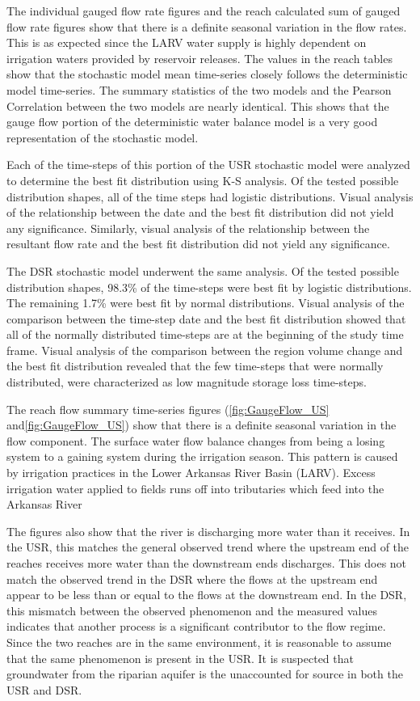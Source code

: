 The individual gauged flow rate figures and the reach calculated sum of gauged flow rate figures show that there is a definite seasonal variation in the flow rates.  This is as expected since the LARV water supply is highly dependent on irrigation waters provided by reservoir releases.  The values in the reach tables show that the stochastic model mean time-series closely follows the deterministic model time-series.  The summary statistics of the two models and the Pearson Correlation between the two models are nearly identical.  This shows that the gauge flow portion of the deterministic water balance model is a very good representation of the stochastic model.  

Each of the time-steps of this portion of the USR stochastic model were analyzed to determine the best fit distribution using K-S analysis.  Of the tested possible distribution shapes, all of the time steps had logistic distributions.  Visual analysis of the relationship between the date and the best fit distribution did not yield any significance.  Similarly, visual analysis of the relationship between the resultant flow rate and the best fit distribution did not yield any significance. 

The DSR stochastic model underwent the same analysis.  Of the tested possible distribution shapes, 98.3\% of the time-steps were best fit by logistic distributions.  The remaining 1.7\% were best fit by normal distributions.  Visual analysis of the comparison between the time-step date and the best fit distribution showed that all of the normally distributed time-steps are at the beginning of the study time frame.   Visual analysis of the comparison between the region volume change and the best fit distribution revealed that the few time-steps that were normally distributed, were characterized as low magnitude storage loss time-steps.

The reach flow summary time-series figures (\ref{fig:GaugeFlow_US} and\ref{fig:GaugeFlow_US}) show that there is a definite seasonal variation in the flow component.  The surface water flow balance changes from being a losing system to a gaining system during the irrigation season.  This pattern is caused by irrigation practices in the Lower Arkansas River Basin (LARV).  Excess irrigation water applied to fields runs off into tributaries which feed into the Arkansas River

The figures also show that the river is discharging more water than it receives.  In the USR, this matches the general observed trend where the upstream end of the reaches receives more water than the downstream ends discharges.  This does not match the observed trend in the DSR where the flows at the upstream end appear to be less than or equal to the flows at the downstream end.  In the DSR, this mismatch between the observed phenomenon and the measured values indicates that another process is a significant contributor to the flow regime.  Since the two reaches are in the same environment, it is reasonable to assume that the same phenomenon is present in the USR.  It is suspected that groundwater from the riparian aquifer is the unaccounted for source in both the USR and DSR.

